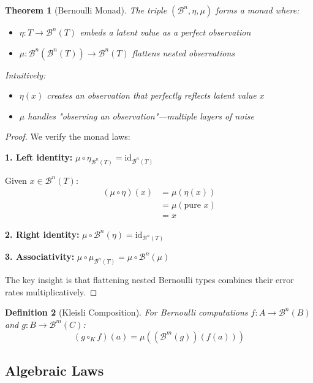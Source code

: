\documentclass[11pt,final,hidelinks]{article}
\newtheorem{theorem}{Theorem}[section]
\newtheorem{definition}[theorem]{Definition}
\begin{document}
\begin{theorem}[Bernoulli Monad]
The triple $(\mathcal{B}^n, \eta, \mu)$ forms a monad where:
\begin{itemize}
    \item $\eta: T \to \mathcal{B}^n(T)$ embeds a latent value as a perfect observation
    \item $\mu: \mathcal{B}^n(\mathcal{B}^n(T)) \to \mathcal{B}^n(T)$ flattens nested observations
\end{itemize}

Intuitively:
\begin{itemize}
    \item $\eta(x)$ creates an observation that perfectly reflects latent value $x$
    \item $\mu$ handles "observing an observation"—multiple layers of noise
\end{itemize}
\end{theorem}

\begin{proof}
We verify the monad laws:

\textbf{1. Left identity:} $\mu \circ \eta_{\mathcal{B}^n(T)} = \text{id}_{\mathcal{B}^n(T)}$

Given $x \in \mathcal{B}^n(T)$:
\begin{align}
(\mu \circ \eta)(x) &= \mu(\eta(x)) \\
&= \mu(\text{pure } x) \\
&= x
\end{align}

\textbf{2. Right identity:} $\mu \circ \mathcal{B}^n(\eta) = \text{id}_{\mathcal{B}^n(T)}$

\textbf{3. Associativity:} $\mu \circ \mu_{\mathcal{B}^n(T)} = \mu \circ \mathcal{B}^n(\mu)$

The key insight is that flattening nested Bernoulli types combines their error rates multiplicatively.
\end{proof}

\begin{definition}[Kleisli Composition]
For Bernoulli computations $f: A \to \mathcal{B}^n(B)$ and $g: B \to \mathcal{B}^m(C)$:
\begin{equation}
(g \circ_K f)(a) = \mu((\mathcal{B}^m(g))(f(a)))
\end{equation}
\end{definition}

\subsection{Algebraic Laws}
\end{document}
